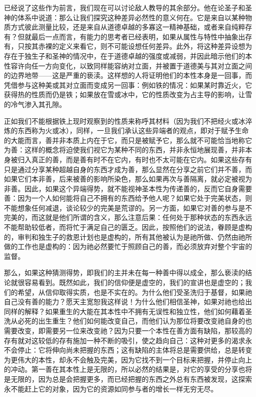 已经说了这些作为前言，我们现在可以讨论敌人教导的其余部分。他在论圣子和圣神的体系中说道：那么让我们探究这种差异必然性的意义何在。它是来自以某种物质方式彼此测量比较，还是来自从道德卓越的多寡这一精神基础，或者来自纯粹存有？但就最后一点而言，有能力的思考者已经表明，如果从属性与特性中抽象出存有，只按其赤裸的定义来看它，则不可能设想任何差异。此外，将这种差异设想为存在于独生子和圣神的情况中，在于道德卓越的强度或减弱，并因此暗示他们的本性容许向任一方向变化，以致同样能容纳对立面，并被置于道德美与其对立面之间的边界地带——这是严重的亵渎。这样想的人将证明他们的本性本身是一回事，而凭借参与这种美或其对立面而变成另一回事：例如铁的情况：如果某时靠近火，它获得热的性质而仍是铁；如果放在雪或冰中，它的性质改变为占主导的影响，让雪的冷气渗入其孔隙。\par

正如我们不能根据铁上现时观察到的性质来称呼其材料（因为我们不把经火或冰淬炼的东西称为火或冰），同样，一旦我们承认这些异端者的观点，即对于赋予生命的大能而言，善并非本质上内在于它，而只是被赋予它，那么就不可能恰当地称它为善：这样的概念将迫使我们视它为某种不同的东西，并非永恒地展现善，并非本身被归入真正的善，而是善有时不在它内，有时也不太可能在它内。如果这些存有只是通过分享某种超越自身的东西才成为善，那么显然在分享之前它们并不善，而如果它们本非善，后来被善的影响所染色，那么如果再次与善隔离，就必定被视为非善。因此，如果这个异端得势，就不能视神圣本性为传递善的，反而它自身需要善：因为一个人如何能将自己不拥有的东西给予他人呢？如果它处于完美状态，则不能想象任何减退，谈论较少的完美是荒谬的。另一方面，如果它对善的参与是不完美的，而这就是他们所谓的含义，那么注意后果：任何处于那种状态的东西永远不能帮助较低者，而将忙于满足自己的匮乏。因此，按照他们的说法，眷顾是虚构的，审判和独生子的救恩计划也是虚构的，所有其他被认为是祂所做、仍然由祂所做的工作也是虚构的：因为祂必然要忙于照顾自己的善，而必须放弃对整个宇宙的监督。\par

那么，如果这种猜测得势，即我们的主并未在每一种善中得以成全，那么亵渎的结论就很容易看到。既然如此，我们的信仰便是虚空的，我们的宣讲也是虚空的；我们的希望，从信仰取得实质，也是不实在的。为什么他们受圣洗归于基督，如果祂自己没有善的能力？愿天主宽恕我这样说！为什么他们相信圣神，如果对祂也给出同样的解释？如果重生的大能在其本性中不拥有无误性和独立性，他们如何藉着圣洗从必死的出生重生？他们如何能改变自己，而他们认为那位将要改变祂自身的也需要改变，即需要另一位来改变祂？因为只要一个本性在善方面有缺陷，那较高的存有就对这较低的存有施加一种不断的吸引，使之趋向自己：这种对更多的渴求永不会停止：它将伸向尚未把握的东西；这有缺陷的主体将总是需要供给，总是转变为更伟大的本性，却永不会触及完美，因为它找不到一个目标来把握，并停止向上的冲动。第一善在其本性上是无限的，所以必然的结果是，对它的享受的分享也将是无限的，因为总是会把握更多，而已经把握的东西之外总有东西被发现，这探索永不能赶上它的对象，因为它的资源如同参与者的增长一样无穷无尽。\par

